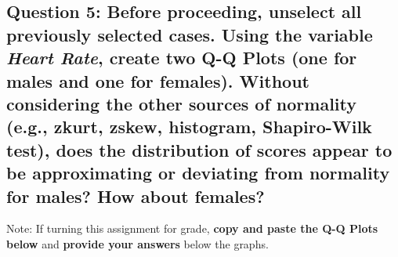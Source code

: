 \documentclass[11pt,]{article}
\begin{document}
\hypertarget{question-5-before-proceeding-unselect-all-previously-selected-cases.-using-the-variable-heart-rate-create-two-q-q-plots-one-for-males-and-one-for-females.-without-considering-the-other-sources-of-normality-e.g.-zkurt-zskew-histogram-shapiro-wilk-test-does-the-distribution-of-scores-appear-to-be-approximating-or-deviating-from-normality-for-males-how-about-females}{%
\subsection{\texorpdfstring{\textbf{Question 5}: Before proceeding,
unselect \textbf{all} previously selected cases. Using the variable
\emph{Heart Rate}, create two Q-Q Plots (one for males and one for
females). Without considering the other sources of normality (e.g.,
zkurt, zskew, histogram, Shapiro-Wilk test), does the distribution of
scores appear to be approximating or deviating from normality for males?
How about
females?}{Question 5: Before proceeding, unselect all previously selected cases. Using the variable Heart Rate, create two Q-Q Plots (one for males and one for females). Without considering the other sources of normality (e.g., zkurt, zskew, histogram, Shapiro-Wilk test), does the distribution of scores appear to be approximating or deviating from normality for males? How about females?}}\label{question-5-before-proceeding-unselect-all-previously-selected-cases.-using-the-variable-heart-rate-create-two-q-q-plots-one-for-males-and-one-for-females.-without-considering-the-other-sources-of-normality-e.g.-zkurt-zskew-histogram-shapiro-wilk-test-does-the-distribution-of-scores-appear-to-be-approximating-or-deviating-from-normality-for-males-how-about-females}}

Note: If turning this assignment for grade, \textbf{copy and paste the
Q-Q Plots below} and \textbf{provide your answers} below the graphs.
\end{document}
